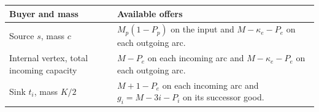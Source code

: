 \documentclass[11pt,oneside,openany,notitlepage]{report}
\begin{document}
\begin{center}
\small
\begin{tabular}{@{}>{\raggedright\arraybackslash}p{.32\linewidth}
  >{\raggedright\arraybackslash}p{.63\linewidth}@{}}
\toprule
Buyer and mass & Available offers\\ \midrule
Source \(s\), mass \(c\) & \(M_p(1-P_p)\) on the input and
 \(M-\kappa_e-P_e\) on each outgoing arc.\\
Internal vertex, total incoming capacity & \(M-P_e\) on each incoming
 arc and \(M-\kappa_e-P_e\) on each outgoing arc.\\
Sink \(t_i\), mass \(K/2\) & \(M+1-P_e\) on each incoming arc and
 \(g_i=M-3i-P_i\) on its successor good.\\ \bottomrule
\end{tabular}
\end{center}
\end{document}
